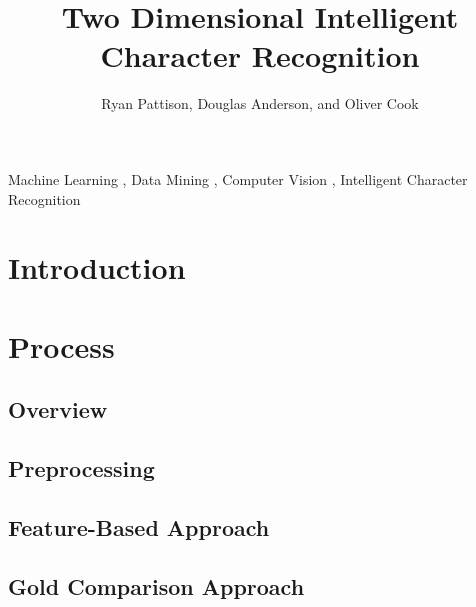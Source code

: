 \documentclass[final,3p,12pt]{elsarticle}
\begin{document}
\begin{frontmatter}

\title{Two Dimensional Intelligent Character Recognition}


\author[ryan,doug,oliver]{Ryan Pattison, Douglas Anderson, and Oliver Cook}
\address[ryan]{ryan.m.pattison@gmail.com}
\address[doug]{dander01@uoguelph.ca}
\address[oliver]{cooko@uoguelph.ca}


\begin{abstract}

\end{abstract}

\begin{keyword}
Machine Learning \sep
Data Mining \sep
Computer Vision \sep
Intelligent Character Recognition
\end{keyword}

\end{frontmatter}

\section{Introduction}
\label{intro}



\section{Process}
\label{process}

\subsection{Overview}
\label{process:overview}



\subsection{Preprocessing}
\label{process:preprocessing}



\subsection{Feature-Based Approach}
\label{process:featurebased}



\subsection{Gold Comparison Approach}
\end{document}
